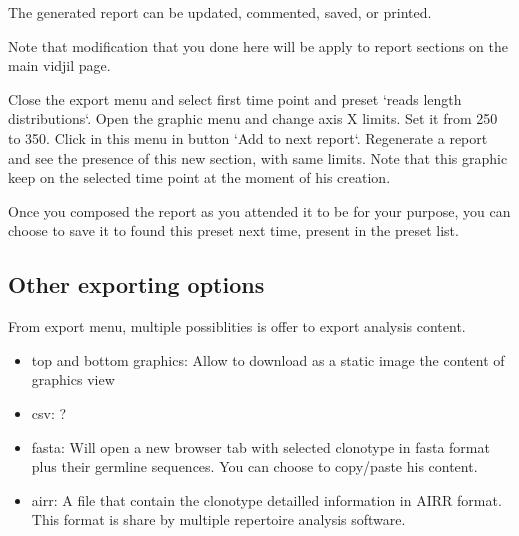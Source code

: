 




The generated report can be updated, commented, saved, or printed.


Note that modification that you done here will be apply to report sections on the main vidjil page.


Close the export menu and select first time point and preset `reads length distributions`.
Open the graphic menu and change axis X limits. Set it from 250 to 350.
Click in this menu in button `Add to next report`. 
Regenerate a report and see the presence of this new section, with same limits.
Note that this graphic keep on the selected time point at the moment of his creation.

Once you composed the report as you attended it to be for your purpose, you can choose to save it to found this preset next time, present in the preset list.

\subsection{Other exporting options}

From export menu, multiple possiblities is offer to export analysis content.
\begin{itemize}
  \item top and bottom graphics: Allow to download as a static image the content of graphics view
  \item csv:  ? %
  \item fasta: Will open a new browser tab with selected clonotype in fasta format plus their germline sequences. You can choose to copy/paste his content.
  \item airr: A file that contain the clonotype detailled information in AIRR format. This format is share by multiple repertoire analysis software. 
\end{itemize}

